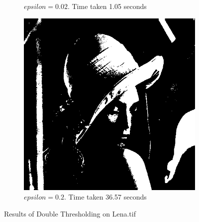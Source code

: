 \documentclass[a4paper]{article}
\begin{document}
\begin{figure}[h]
\begin{subfigure}[b]{0.25\textwidth}
                \caption{$epsilon=0.02$. Time taken 1.05 seconds}
                \label{fig:5b}
                
        \end{subfigure}
        \begin{subfigure}[b]{0.25\textwidth}
                \centering
                \includegraphics[width=\textwidth]{q3-lena-02.png}
                \caption{$epsilon=0.2$. Time taken 36.57 seconds}
                \label{fig:5c}
                
        \end{subfigure}
        
        \caption{Results of Double Thresholding on Lena.tif}        
        \label{fig:5}
\end{figure}
\end{document}

